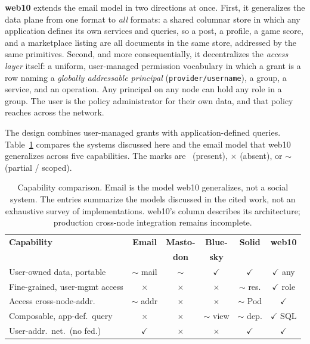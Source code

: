 \documentclass[sigconf, nonacm]{acmart}
\begin{document}
\textbf{web10} extends the email model in two directions at once. First, it
generalizes the data plane from one format to \emph{all} formats: a shared
columnar store in which any application defines its own services and queries,
so a post, a profile, a game score, and a marketplace listing are all documents
in the same store, addressed by the same primitives. Second, and more
consequentially, it decentralizes the \emph{access layer} itself: a uniform,
user-managed permission vocabulary in which a grant is a row naming a
\emph{globally addressable principal} (\texttt{provider/username}), a group, a
service, and an operation. Any principal on any node can hold any role in a
group. The user is the policy administrator for their own data, and that policy
reaches across the network.

The design combines user-managed grants with application-defined queries.
Table~\ref{tab:capabilities} compares the systems discussed here and the
email model that web10 generalizes across five capabilities. The marks are
\checkmark\ (present), $\times$ (absent), or $\sim$ (partial / scoped).

\begin{table}[t]
\caption{Capability comparison. Email is the model web10 generalizes, not a
social system. The entries summarize the models discussed in the cited work,
not an exhaustive survey of implementations. web10's column describes its
architecture; production cross-node integration remains incomplete.}
\label{tab:capabilities}
\centering
\scriptsize
\setlength{\tabcolsep}{5pt}
\begin{tabular}{@{}p{3.6cm}ccccc@{}}
\toprule
\textbf{Capability} & \textbf{Email} & \textbf{Masto-} & \textbf{Blue-} & \textbf{Solid} & \textbf{web10} \\
 & & \textbf{don} & \textbf{sky} & & \\
\midrule
User-owned data, portable & $\sim$ mail & $\sim$ & $\checkmark$ & $\checkmark$ & $\checkmark$ any \\
Fine-grained, user-mgmt access & $\times$ & $\times$ & $\times$ & $\sim$ res. & $\checkmark$ role \\
Access cross-node-addr. & $\sim$ addr & $\times$ & $\times$ & $\sim$ Pod & $\checkmark$ \\
Composable, app-def.\ query & $\times$ & $\times$ & $\sim$ view & $\sim$ dep. & $\checkmark$ SQL \\
User-addr.\ net.\ (no fed.) & $\checkmark$ & $\times$ & $\times$ & $\checkmark$ & $\checkmark$ \\
\bottomrule
\end{tabular}
\end{table}
\end{document}
